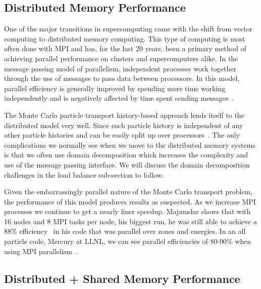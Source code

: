 \subsection*{ \textbf{Distributed Memory Performance}}

One of the major transitions in supercomputing came with the shift from vector computing to distributed memory computing.
%
This type of computing is most often done with MPI and has, for the last 20 years, been a primary method of achieving parallel performance on clusters and supercomputers alike.
%
In the message passing model of parallelism, independent processes work together through the use of messages to pass data between processors.
%
In this model, parallel efficiency is generally improved by spending more time working independently and is negatively affected by time spent sending messages~\cite{yanghybrid}.
%

%
The Monte Carlo particle transport history-based approach lends itself to the distributed model very well.
%
Since each particle history is independent of any other particle histories and can be easily split up over processors~\cite{yanghybrid}.
%
The only complications we normally see when we move to the distributed memory systems is that we often use domain decomposition which increases the complexity and use of the message passing interface.
%
We will discuss the domain decomposition challenges in the load balance sub-section to follow.
%

%
Given the embarrassingly parallel nature of the Monte Carlo transport problem, the performance of this model produces results as suspected.
%
As we increase MPI processes we continue to get a nearly liner speedup.
%
Majumdar shows that with 16 nodes and 8 MPI tasks per node, his biggest run, he was still able to achieve a 88\% efficiency~\cite{majumdar2000parallel} in his code that was parallel over zones and energies.
%
In an all particle code, Mercury at LLNL, we can see parallel efficiencies of 80-90\% when using MPI parallelism~\cite{procassini2005load}.

\subsection*{ \textbf{Distributed + Shared Memory Performance}}

